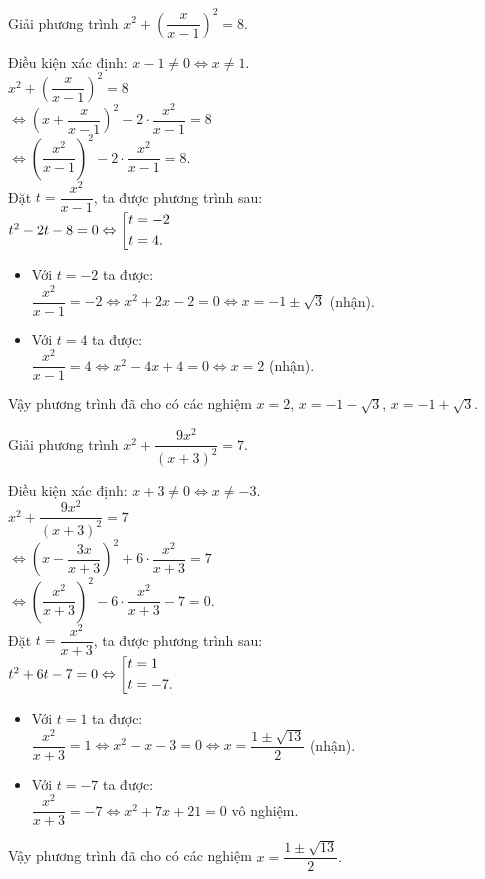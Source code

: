 \begin{vd}%
	Giải phương trình $x^2 + \left( \dfrac{x}{x-1} \right)^2 = 8$.
	\loigiai
	{
		Điều kiện xác định: $x - 1 \neq 0 \Leftrightarrow x \neq 1$.\\
		\hspace*{0.6cm} $x^2 + \left( \dfrac{x}{x-1}\right)^2 = 8$\\
		$\Leftrightarrow \left(x + \dfrac{x}{x-1} \right)^2 - 2\cdot\dfrac{x^2}{x-1} = 8$\\
		$\Leftrightarrow \left( \dfrac{x^2}{x-1}\right)^2 - 2 \cdot \dfrac{x^2}{x-1} = 8$.\\
		Đặt $t = \dfrac{x^2}{x-1}$, ta được phương trình sau:\\
		\hspace*{0.6cm} $t^2 - 2t - 8 = 0 \Leftrightarrow \left[\begin{aligned}& t = -2 \\& t = 4.\end{aligned}\right.$
		\begin{itemize}
			\item Với $t = -2$ ta được:\\
			$\dfrac{x^2}{x-1} = -2 \Leftrightarrow x^2 + 2x - 2 = 0 \Leftrightarrow x = -1 \pm \sqrt{3}$ (nhận).
			\item Với $t = 4$ ta được:\\
			$\dfrac{x^2}{x-1} = 4 \Leftrightarrow x^2 - 4x + 4 = 0 \Leftrightarrow x = 2$ (nhận).
		\end{itemize}
		Vậy phương trình đã cho có các nghiệm $x = 2$, $x = - 1 - \sqrt{3}$, $x = - 1 + \sqrt{3}$.
	}
\end{vd}


\begin{vd}%
	Giải phương trình $x^2 + \dfrac{9x^2}{(x+3)^2} = 7$.
	\loigiai
	{
		Điều kiện xác định: $x + 3 \neq 0 \Leftrightarrow x \neq -3$.\\
		\hspace*{0.6cm} $x^2 + \dfrac{9x^2}{(x+3)^2} = 7$\\
		$\Leftrightarrow \left(x - \dfrac{3x}{x+3}\right)^2 + 6 \cdot \dfrac{x^2}{x+3} = 7$\\
		$\Leftrightarrow \left(\dfrac{x^2}{x+3}\right)^2 - 6 \cdot \dfrac{x^2}{x+3} - 7 = 0$.\\
		Đặt $t = \dfrac{x^2}{x+3}$, ta được phương trình sau:\\
		\hspace*{0.6cm} $t^2 + 6t - 7 = 0 \Leftrightarrow \left[\begin{aligned}& t = 1 \\& t = -7.\end{aligned}\right.$
		\begin{itemize}
			\item Với $t = 1$ ta được:\\
			$\dfrac{x^2}{x+3} = 1 \Leftrightarrow x^2 - x -3 = 0 \Leftrightarrow x = \dfrac{1 \pm \sqrt{13}}{2}$ (nhận).
			\item Với $t = -7$ ta được:\\
			$\dfrac{x^2}{x+3} = -7 \Leftrightarrow x^2 + 7x + 21 = 0$ vô nghiệm.
		\end{itemize}
		Vậy phương trình đã cho có các nghiệm $x = \dfrac{1 \pm \sqrt{13}}{2}.$
	}
\end{vd}



